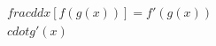 \documentclass[preview]{standalone}
\begin{document}
\begin{align*}
\quad\\frac{d}{dx} [f(g(x))] = f'(g(x)) \quad\\cdot g'(x)
\end{align*}
\end{document}

